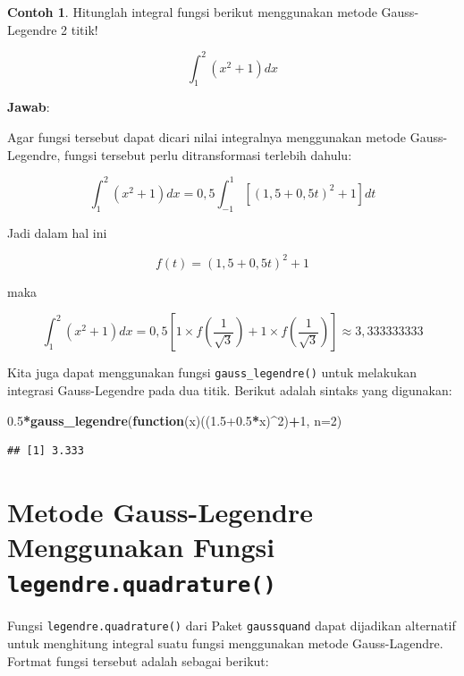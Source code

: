\documentclass[
]{book}
\newenvironment{Shaded}{\begin{snugshade}}{\end{snugshade}}
\newcommand{\AttributeTok}[1]{\textcolor[rgb]{0.13,0.29,0.53}{#1}}
\newcommand{\ControlFlowTok}[1]{\textcolor[rgb]{0.13,0.29,0.53}{\textbf{#1}}}
\newcommand{\DecValTok}[1]{\textcolor[rgb]{0.00,0.00,0.81}{#1}}
\newcommand{\FloatTok}[1]{\textcolor[rgb]{0.00,0.00,0.81}{#1}}
\newcommand{\FunctionTok}[1]{\textcolor[rgb]{0.13,0.29,0.53}{\textbf{#1}}}
\newcommand{\NormalTok}[1]{#1}
\newcommand{\SpecialCharTok}[1]{\textcolor[rgb]{0.81,0.36,0.00}{\textbf{#1}}}
\theoremstyle{definition}
\theoremstyle{definition}
\newtheorem{example}{Contoh}[chapter]
\theoremstyle{definition}
\theoremstyle{definition}
\theoremstyle{remark}
\begin{document}
\begin{example}
\protect\hypertarget{exm:gausslanexm}{}\label{exm:gausslanexm}Hitunglah integral fungsi berikut menggunakan metode Gauss-Legendre 2 titik!
\end{example}

\[
\int_1^2 \left(x^2+1\right)dx
\]

\textbf{Jawab}:

Agar fungsi tersebut dapat dicari nilai integralnya menggunakan metode Gauss-Legendre, fungsi tersebut perlu ditransformasi terlebih dahulu:

\[
\int_1^2 \left(x^2+1\right)dx=0,5\int_{-1}^1 \left[\left(1,5+0,5t\right)^2+1\right]dt
\]

Jadi dalam hal ini

\[
f\left(t\right)=\left(1,5+0,5t\right)^2+1
\]

maka

\[
\int_1^2 \left(x^2+1\right)dx=0,5\left[1\times f\left(\frac{1}{\sqrt{3}}\right)+1\times f\left(\frac{1}{\sqrt{3}}\right)\right]\approx 3,333333333
\]

Kita juga dapat menggunakan fungsi \texttt{gauss\_legendre()} untuk melakukan integrasi Gauss-Legendre pada dua titik. Berikut adalah sintaks yang digunakan:

\begin{Shaded}
\begin{Highlighting}[]
\FloatTok{0.5}\SpecialCharTok{*}\FunctionTok{gauss\_legendre}\NormalTok{(}\ControlFlowTok{function}\NormalTok{(x)((}\FloatTok{1.5+0.5}\SpecialCharTok{*}\NormalTok{x)}\SpecialCharTok{\^{}}\DecValTok{2}\NormalTok{)}\SpecialCharTok{+}\DecValTok{1}\NormalTok{,}
               \AttributeTok{n=}\DecValTok{2}\NormalTok{)}
\end{Highlighting}
\end{Shaded}

\begin{verbatim}
## [1] 3.333
\end{verbatim}

\hypertarget{othergauss}{%
\section{\texorpdfstring{Metode Gauss-Legendre Menggunakan Fungsi \texttt{legendre.quadrature()}}{Metode Gauss-Legendre Menggunakan Fungsi legendre.quadrature()}}\label{othergauss}}

Fungsi \texttt{legendre.quadrature()} dari Paket \texttt{gaussquand} dapat dijadikan alternatif untuk menghitung integral suatu fungsi menggunakan metode Gauss-Lagendre. Fortmat fungsi tersebut adalah sebagai berikut:
\end{document}
